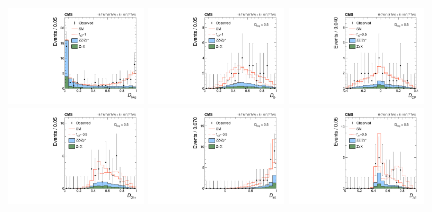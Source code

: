 \begin{figure}
\centering
\includegraphics[width=0.32\textwidth]{Spin_Parity/cCompare_DataMC_AllTeV_D_bkg.pdf}
\includegraphics[width=0.32\textwidth]{Spin_Parity/cCompare_DataMC_AllTeV_D_g1_vs_g4_phi0_SignalEnriched.pdf}
\includegraphics[width=0.32\textwidth]{Spin_Parity/cCompare_DataMC_AllTeV_D_g4int_phi0_SignalEnriched.pdf}
\includegraphics[width=0.32\textwidth]{Spin_Parity/cCompare_DataMC_AllTeV_D_g1_vs_g2_phi0_SignalEnriched.pdf}
\includegraphics[width=0.32\textwidth]{Spin_Parity/cCompare_DataMC_AllTeV_D_g2int_phi0_SignalEnriched.pdf}
\includegraphics[width=0.32\textwidth]{Spin_Parity/cCompare_DataMC_AllTeV_D_g1Q2_phi0_SignalEnriched.pdf}

\end{figure}
